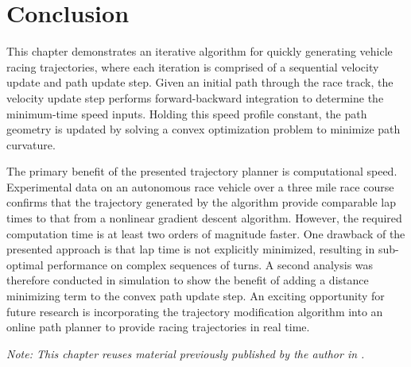 \section{Conclusion}
This chapter demonstrates an iterative algorithm for quickly generating vehicle racing trajectories, where each iteration is comprised of
 a sequential velocity update and path update step. Given an initial path through the race track, the 
 velocity update step performs forward-backward integration to determine the minimum-time speed inputs. Holding this speed 
 profile constant, the path geometry is updated by solving a convex optimization problem to minimize path curvature.

 The primary benefit of the presented trajectory planner is computational speed. Experimental data on an autonomous race vehicle over a
 three mile race course confirms that the trajectory generated by the algorithm provide comparable lap times to that from a nonlinear gradient descent algorithm. However, the
 required computation time is at least two orders of magnitude faster. One drawback of the presented approach is that lap time is not explicitly minimized, resulting
 in sub-optimal performance on complex sequences of turns. A second analysis was therefore conducted in simulation to show the
 benefit of adding a distance minimizing term to the convex path update step. An exciting opportunity for future research is incorporating the trajectory modification algorithm into an online path planner to provide
 racing trajectories in real time. 
 
 \textit{Note: This chapter reuses material previously published by the author in \cite{kapaniadscc}.}
